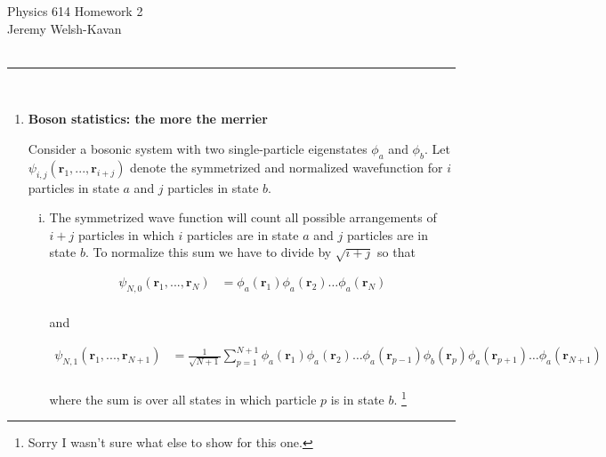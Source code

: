 \documentclass[]{article}
\begin{document}
{\Large Physics 614 Homework 2}\\
{Jeremy Welsh-Kavan}\\
\vspace{0.2 cm}
\hfill \\
\noindent\rule{15cm}{0.4pt} \\

\begin{enumerate}[1.]

\item {\bf Boson statistics: the more the merrier}

Consider a bosonic system with two single-particle eigenstates $\phi_a$ and $\phi_b$. Let $\psi_{i,j} (\bm{r}_1, ..., \bm{r}_{i+j} )$ denote the
symmetrized and normalized wavefunction for $i$ particles in state $a$ and $j$ particles in state $b$. \\

\begin{enumerate}[i.]

\item The symmetrized wave function will count all possible arrangements of $i+j$ particles in which $i$ particles are in state $a$ and $j$ particles are in state $b$. To normalize this sum we have to divide by $\sqrt{i+j}$ so that

\begin{equation}
\begin{split}
\psi_{N,0} (\bm{r}_1, ..., \bm{r}_{N} ) & = \phi_a( \bm{r}_1)\phi_a(\bm{r}_2)\dots\phi_a(\bm{r}_N) \\
\end{split}
\end{equation}

and 

\begin{equation}
\begin{split}
\psi_{N,1} (\bm{r}_1, ..., \bm{r}_{N+1} ) & = \frac{1}{\sqrt{N+1}}  \sum_{p=1}^{N+1} \phi_a( \bm{r}_1)\phi_a(\bm{r}_2)  \dots \phi_a(\bm{r}_{p-1}) \phi_b(\bm{r}_p) \phi_a(\bm{r}_{p+1}) \dots \phi_a(\bm{r}_{N+1}) \\
\end{split}
\end{equation}

where the sum is over all states in which particle $p$ is in state $b$. \footnote{Sorry I wasn't sure what else to show for this one.} \\


\end{enumerate}
\end{enumerate}
\end{document}
